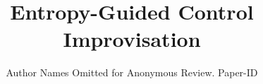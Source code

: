\documentclass[conference]{IEEEtran}
\theoremstyle{remark}
\begin{document}
\title{Entropy-Guided Control Improvisation}

\author{Author Names Omitted for Anonymous Review. Paper-ID }





% 


\maketitle
\end{document}
